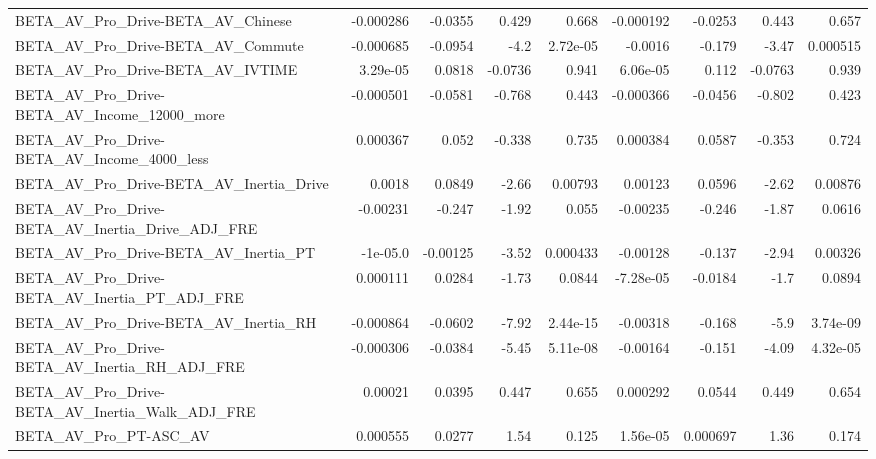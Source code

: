 \begin{tabular}{lrrrrrrrr}
BETA\_AV\_Pro\_Drive-BETA\_AV\_Chinese                  &   -0.000286 &      -0.0355 &    0.429 &    0.668 &  -0.000192 &     -0.0253 &        0.443 &         0.657 \\
BETA\_AV\_Pro\_Drive-BETA\_AV\_Commute                  &   -0.000685 &      -0.0954 &     -4.2 & 2.72e-05 &    -0.0016 &      -0.179 &        -3.47 &      0.000515 \\
BETA\_AV\_Pro\_Drive-BETA\_AV\_IVTIME                   &    3.29e-05 &       0.0818 &  -0.0736 &    0.941 &   6.06e-05 &       0.112 &      -0.0763 &         0.939 \\
BETA\_AV\_Pro\_Drive-BETA\_AV\_Income\_12000\_more        &   -0.000501 &      -0.0581 &   -0.768 &    0.443 &  -0.000366 &     -0.0456 &       -0.802 &         0.423 \\
BETA\_AV\_Pro\_Drive-BETA\_AV\_Income\_4000\_less         &    0.000367 &        0.052 &   -0.338 &    0.735 &   0.000384 &      0.0587 &       -0.353 &         0.724 \\
BETA\_AV\_Pro\_Drive-BETA\_AV\_Inertia\_Drive            &      0.0018 &       0.0849 &    -2.66 &  0.00793 &    0.00123 &      0.0596 &        -2.62 &       0.00876 \\
BETA\_AV\_Pro\_Drive-BETA\_AV\_Inertia\_Drive\_ADJ\_FRE    &    -0.00231 &       -0.247 &    -1.92 &    0.055 &   -0.00235 &      -0.246 &        -1.87 &        0.0616 \\
BETA\_AV\_Pro\_Drive-BETA\_AV\_Inertia\_PT               &    -1e-05.0 &     -0.00125 &    -3.52 & 0.000433 &   -0.00128 &      -0.137 &        -2.94 &       0.00326 \\
BETA\_AV\_Pro\_Drive-BETA\_AV\_Inertia\_PT\_ADJ\_FRE       &    0.000111 &       0.0284 &    -1.73 &   0.0844 &  -7.28e-05 &     -0.0184 &         -1.7 &        0.0894 \\
BETA\_AV\_Pro\_Drive-BETA\_AV\_Inertia\_RH               &   -0.000864 &      -0.0602 &    -7.92 & 2.44e-15 &   -0.00318 &      -0.168 &         -5.9 &      3.74e-09 \\
BETA\_AV\_Pro\_Drive-BETA\_AV\_Inertia\_RH\_ADJ\_FRE       &   -0.000306 &      -0.0384 &    -5.45 & 5.11e-08 &   -0.00164 &      -0.151 &        -4.09 &      4.32e-05 \\
BETA\_AV\_Pro\_Drive-BETA\_AV\_Inertia\_Walk\_ADJ\_FRE     &     0.00021 &       0.0395 &    0.447 &    0.655 &   0.000292 &      0.0544 &        0.449 &         0.654 \\
BETA\_AV\_Pro\_PT-ASC\_AV                              &    0.000555 &       0.0277 &     1.54 &    0.125 &   1.56e-05 &    0.000697 &         1.36 &         0.174 \\

\end{tabular}
